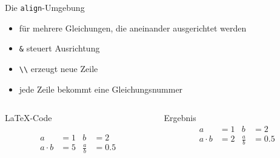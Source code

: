 \begin{frame}[fragile]{Die \texttt{align}-Umgebung}
    \begin{itemize}
        \item für mehrere Gleichungen, die aneinander ausgerichtet werden
        \item \texttt{\&} steuert Ausrichtung
        \item \texttt{\textbackslash\textbackslash} erzeugt neue Zeile
        \item jede Zeile bekommt eine Gleichungsnummer
    \end{itemize}
  \begin{columns}[T]
    \begin{column}{0.65\textwidth}
      \begin{block}{\LaTeX-Code}
        \begin{lstverbatim}
        \begin{align}
          a         &= 1 & b           &= 2 \\
          a \cdot b &= 5 & \frac{a}{b} &= 0.5
        \end{align}
        \end{lstverbatim}
      \end{block}
    \end{column}
    \begin{column}{0.3\textwidth}
      \begin{block}{Ergebnis}
        \begin{align}
          a         &= 1 & b           &= 2 \\
          a \cdot b &= 2 & \frac{a}{b} &= 0.5
        \end{align}
      \end{block}
    \end{column}
  \end{columns}
\end{frame}

